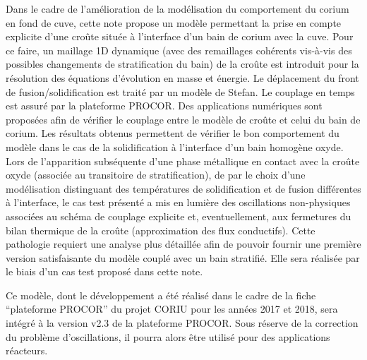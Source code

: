 Dans le cadre de l’amélioration de la modélisation du comportement du corium en fond de cuve, cette note propose un modèle permettant la prise en compte explicite d’une croûte située à l’interface d’un bain de
corium avec la cuve. Pour ce faire, un maillage 1D dynamique (avec des remaillages cohérents vis-à-vis des possibles changements de stratification du bain) de la croûte est introduit pour la résolution des équations d’évolution en masse et énergie. Le déplacement du front de fusion/solidification est traité par un modèle de Stefan. Le couplage en temps est assuré par la plateforme PROCOR. Des applications numériques sont proposées afin de vérifier le couplage entre le modèle de croûte et celui du bain de corium. Les résultats obtenus permettent de vérifier le bon comportement du modèle dans le cas de la solidification à l'interface d'un bain homogène oxyde. Lors de l'apparition  subséquente d'une phase métallique en contact avec la croûte oxyde (associée au transitoire de stratification), de par le choix d'une modélisation distinguant des températures de solidification et de fusion différentes à l'interface, le cas test présenté a mis en lumière des oscillations non-physiques associées au schéma de couplage explicite et, eventuellement, aux fermetures du bilan thermique de la croûte (approximation des flux conductifs). Cette pathologie requiert une analyse plus détaillée afin de pouvoir fournir une première version satisfaisante du modèle couplé avec un bain stratifié. Elle sera réalisée par le biais d'un cas test proposé dans cette note.

Ce modèle, dont le développement a été réalisé dans le cadre de la fiche ``plateforme PROCOR'' du projet CORIU pour les années 2017 et 2018, sera intégré à la version v2.3 de la plateforme PROCOR. Sous réserve de la correction du problème d'oscillations, il pourra alors être utilisé pour des applications réacteurs.
